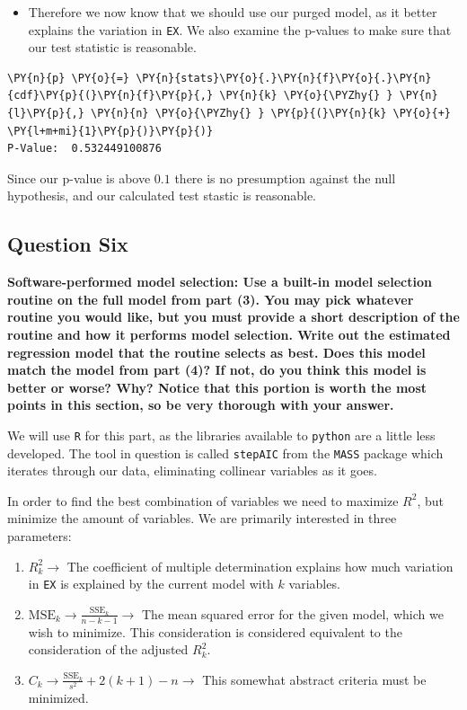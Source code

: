 \documentclass[10pt]{article}\usepackage[]{graphicx}\usepackage[]{xcolor}
\begin{document}
    \begin{itemize}
\itemsep1pt\parskip0pt
\item
  Therefore we now know that we should use our purged model, as it better explains the variation in \texttt{EX}. We also
  examine the p-values to make sure that our test statistic is reasonable.
\end{itemize}

    \begin{Verbatim}[commandchars=\\\{\}]
\PY{n}{p} \PY{o}{=} \PY{n}{stats}\PY{o}{.}\PY{n}{f}\PY{o}{.}\PY{n}{cdf}\PY{p}{(}\PY{n}{f}\PY{p}{,} \PY{n}{k} \PY{o}{\PYZhy{} } \PY{n}{l}\PY{p}{,} \PY{n}{n} \PY{o}{\PYZhy{} } \PY{p}{(}\PY{n}{k} \PY{o}{+} \PY{l+m+mi}{1}\PY{p}{)}\PY{p}{)}
P-Value:  0.532449100876
\end{Verbatim}

    Since our p-value is above $0.1$ there is no presumption against the
null hypothesis, and our calculated test stastic is reasonable.

    \subsection*{Question Six}
    \textbf{Software-performed model selection: Use a built-in model selection routine on the full model from part (3).
    You may pick whatever routine you would like, but you must provide a short description of the routine and how it
    performs model selection. Write out the estimated regression model that the routine selects as best. Does this
    model match the model from part (4)? If not, do you think this model is better or worse? Why? Notice that this
    portion is worth the most points in this section, so be very thorough with your answer.}\newline


    We will use \texttt{R} for this part, as the libraries available to \texttt{python} are a little less developed. The
    tool in question is called \texttt{stepAIC} from the \texttt{MASS} package which iterates through our data,
    eliminating collinear variables as it goes.

    In order to find the best combination of variables we need to maximize $R^2$, but minimize the amount of variables.
    We are primarily interested in three parameters:

\begin{enumerate}
\def\labelenumi{\arabic{enumi}.}
\itemsep1pt\parskip0pt
\item
  $R^2_k \to$ The coefficient of multiple determination explains how
  much variation in \texttt{EX} is explained by the current model with
  $k$ variables.
\item
  $\text{MSE}_k \to \frac{\text{SSE}_k}{n - k - 1} \to$ The mean squared
  error for the given model, which we wish to minimize. This
  consideration is considered equivalent to the consideration of the
  adjusted $R^2_k$.
\item
  $C_k \to \frac{\text{SSE}_k}{s^2} + 2(k + 1) - n \to$ This somewhat
  abstract criteria must be minimized.
\end{enumerate}
\end{document}
